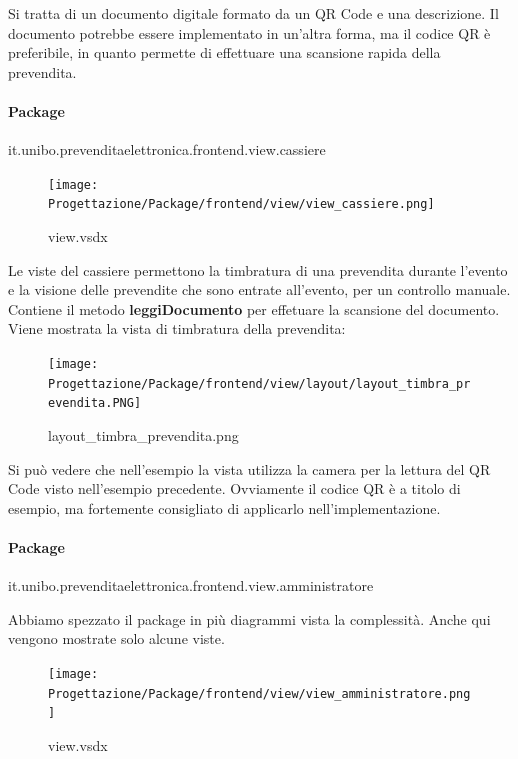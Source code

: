 \documentclass[a4paper]{article}
\begin{document}
Si tratta di un documento digitale formato da un QR Code e una descrizione. Il documento potrebbe essere implementato in un'altra forma, ma il codice QR è preferibile, in quanto permette di effettuare una scansione rapida della prevendita.

\paragraph{Package} it.unibo.prevenditaelettronica.frontend.view.cassiere


\begin{figure}[H]
    \texttt{[image: Progettazione/Package/frontend/view/view\_cassiere.png]}
    \centering
    \caption{view.vsdx}
\end{figure}

Le viste del cassiere permettono la timbratura di una prevendita durante l'evento e la visione delle prevendite che sono entrate all'evento, per un controllo manuale. Contiene il metodo \textbf{leggiDocumento} per effetuare la scansione del documento. Viene mostrata la vista di timbratura della prevendita:

\begin{figure}[H]
    \texttt{[image: Progettazione/Package/frontend/view/layout/layout\_timbra\_prevendita.PNG]}
    \centering
    \caption{layout\_timbra\_prevendita.png}
\end{figure}

Si può vedere che nell'esempio la vista utilizza la camera per la lettura del QR Code visto nell'esempio precedente. Ovviamente il codice QR è a titolo di esempio, ma fortemente consigliato di applicarlo nell'implementazione.

\newpage

\paragraph{Package} it.unibo.prevenditaelettronica.frontend.view.amministratore


Abbiamo spezzato il package in più diagrammi vista la complessità. Anche qui vengono mostrate solo alcune viste.


\begin{figure}[H]
    \texttt{[image: Progettazione/Package/frontend/view/view\_amministratore.png]}
    \centering
    \caption{view.vsdx}
\end{figure}
\end{document}
